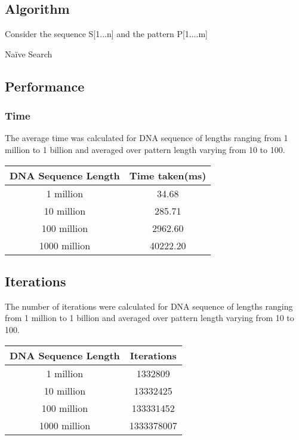 \documentclass{article}
\makeatletter
\def\BState{\State\hskip-\ALG@thistlm}
\makeatother
\begin{document}
\subsection{Algorithm}

Consider the sequence S[1...n] and the pattern P[1....m]

\begin{algorithm}
\caption{Na\"ive Search}\label{euclid}
\end{algorithm}
\clearpage
\subsection{Performance}
\subsubsection{Time}
The average time was calculated for DNA sequence of lengths ranging from 1 million to 1 billion and averaged over pattern length varying from 10 to 100.
\noindent \begin{center}
\begin{tabular}{|c|c|}
\hline 
DNA Sequence Length & Time taken(ms)\tabularnewline
\hline 
\hline 
1 million & 34.68\tabularnewline
\hline 
10 million & 285.71\tabularnewline
\hline 
100 million & 2962.60\tabularnewline
\hline 
1000 million & 40222.20\tabularnewline
\hline 
\end{tabular}
\par\end{center}

\subsection{Iterations}
The number of iterations were calculated for DNA sequence of lengths ranging from 1 million to 1 billion and averaged over pattern length varying from 10 to 100.
\noindent \begin{center}
\begin{tabular}{|c|c|}
\hline 
DNA Sequence Length & Iterations\tabularnewline
\hline 
\hline 
1 million & 1332809\tabularnewline
\hline 
10 million & 13332425\tabularnewline
\hline 
100 million & 133331452\tabularnewline
\hline 
1000 million & 1333378007\tabularnewline
\hline 
\end{tabular}
\par\end{center}
\end{document}
